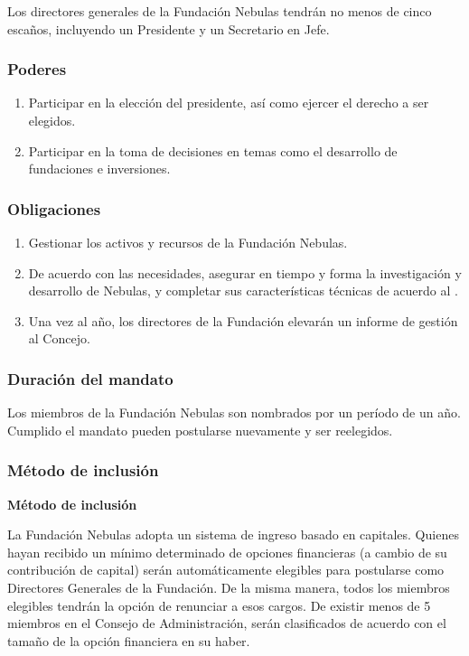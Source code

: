 Los directores generales de la Fundación Nebulas tendrán no menos de cinco escaños, incluyendo un Presidente y un Secretario en Jefe.

\subsubsection{Poderes}

\begin{enumerate}
	\item Participar en la elección del presidente, así como ejercer el derecho a ser elegidos.
	\item Participar en la toma de decisiones en temas como el desarrollo de fundaciones e inversiones.
\end{enumerate}

\subsubsection{Obligaciones}

\begin{enumerate}
	\item Gestionar los activos y recursos de la Fundación Nebulas.
	\item De acuerdo con las necesidades, asegurar en tiempo y forma la investigación y desarrollo de Nebulas, y completar sus características técnicas de acuerdo al \ntechw.
	\item Una vez al año, los directores de la Fundación elevarán un informe de gestión al Concejo.
\end{enumerate}

\subsubsection{Duración del mandato}

Los miembros de la Fundación Nebulas son nombrados por un período de un año. Cumplido el mandato pueden postularse nuevamente y ser reelegidos.

\subsubsection{Método de inclusión}

\textbf{Método de inclusión}

La Fundación Nebulas adopta un sistema de ingreso basado en capitales. Quienes hayan recibido un mínimo determinado de opciones financieras (a cambio de su contribución de capital) serán automáticamente elegibles para postularse como Directores Generales de la Fundación. De la misma manera, todos los miembros elegibles tendrán la opción de renunciar a esos cargos. De existir menos de 5 miembros en el Consejo de Administración, serán clasificados de acuerdo con el tamaño de la opción financiera en su haber.


